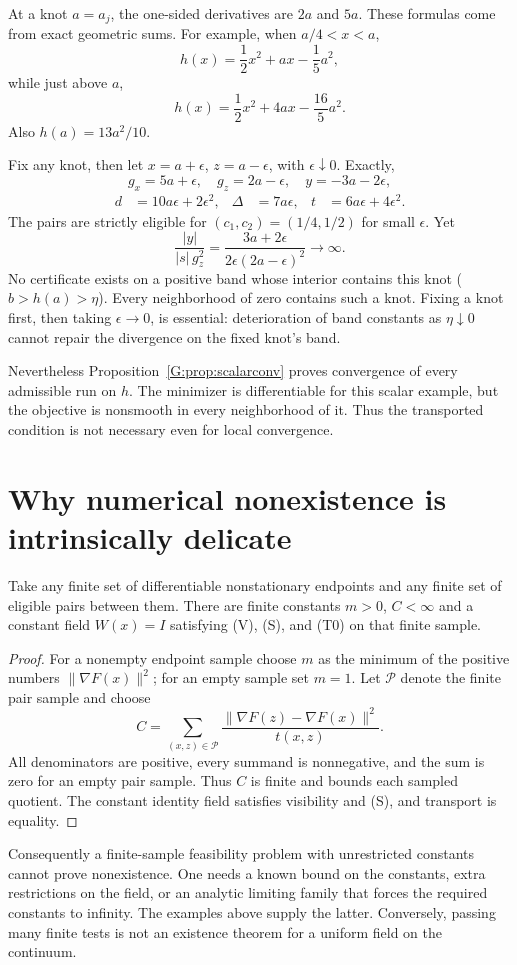 At a knot $a=a_j$, the one-sided derivatives are $2a$ and $5a$. These formulas come from exact geometric sums. For example, when $a/4<x<a$,
\[
 h(x)=\frac12x^2+ax-\frac15a^2,
\]
while just above $a$,
\[
 h(x)=\frac12x^2+4ax-\frac{16}{5}a^2.
\]
Also $h(a)=13a^2/10$.

Fix any knot, then let $x=a+\epsilon$, $z=a-\epsilon$, with $\epsilon\downarrow0$. Exactly,
\[
 g_x=5a+\epsilon,\quad g_z=2a-\epsilon,\quad y=-3a-2\epsilon,
\]
\begin{align*}
 d&=10a\epsilon+2\epsilon^2,&
 \Delta&=7a\epsilon,&
 t&=6a\epsilon+4\epsilon^2.
\end{align*}
The pairs are strictly eligible for $(c_1,c_2)=(1/4,1/2)$ for small $\epsilon$. Yet
\[
 \frac{|y|}{|s|\,g_z^2}
 =\frac{3a+2\epsilon}{2\epsilon(2a-\epsilon)^2}\longrightarrow\infty.
\]
No certificate exists on a positive band whose interior contains this knot ($b>h(a)>\eta$). Every neighborhood of zero contains such a knot. Fixing a knot first, then taking $\epsilon\to0$, is essential: deterioration of band constants as $\eta\downarrow0$ cannot repair the divergence on the fixed knot's band.

Nevertheless Proposition~\ref{G:prop:scalarconv} proves convergence of every admissible run on $h$. The minimizer is differentiable for this scalar example, but the objective is nonsmooth in every neighborhood of it. Thus the transported condition is not necessary even for local convergence.


\setcounter{section}{8}
\setcounter{theorem}{0}
\setcounter{equation}{8}


\section{Why numerical nonexistence is intrinsically delicate}
\begin{proposition}
Take any finite set of differentiable nonstationary endpoints and any finite set of eligible pairs between them. There are finite constants $m>0$, $C<\infty$ and a constant field $W(x)=I$ satisfying (V), (S), and (T0) on that finite sample.
\end{proposition}
\begin{proof}
For a nonempty endpoint sample choose $m$ as the minimum of the positive numbers $\|\nabla F(x)\|^2$; for an empty sample set $m=1$. Let $\mathcal P$ denote the finite pair sample and choose
\[
 C=\sum_{(x,z)\in\mathcal P}
       \frac{\|\nabla F(z)-\nabla F(x)\|^2}{t(x,z)}.
\]
All denominators are positive, every summand is nonnegative, and the sum is zero for an empty pair sample. Thus $C$ is finite and bounds each sampled quotient. The constant identity field satisfies visibility and (S), and transport is equality.
\end{proof}
Consequently a finite-sample feasibility problem with unrestricted constants cannot prove nonexistence. One needs a known bound on the constants, extra restrictions on the field, or an analytic limiting family that forces the required constants to infinity. The examples above supply the latter. Conversely, passing many finite tests is not an existence theorem for a uniform field on the continuum.


